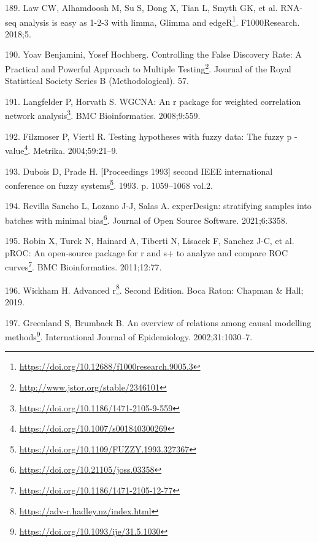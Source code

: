\documentclass[
  12pt,
  a4paper,
  twoside,
  openright]{book}
\DeclareRobustCommand{\href}[2]{#2\footnote{\url{#1}}}
\newlength{\cslhangindent}
\newlength{\cslentryspacingunit} %
\newenvironment{CSLReferences}[2] %
 {%
  \setlength{\parindent}{0pt}
  \ifodd #1
  \let\oldpar\par
  \def\par{\hangindent=\cslhangindent\oldpar}
  \fi
  \setlength{\parskip}{#2\cslentryspacingunit}
 }%
 {}
\begin{document}
\begin{CSLReferences}{0}{0}
\leavevmode{}%
189. Law CW, Alhamdoosh M, Su S, Dong X, Tian L, Smyth GK, et al. \href{https://doi.org/10.12688/f1000research.9005.3}{RNA-seq analysis is easy as 1-2-3 with limma, Glimma and edgeR}. F1000Research. 2018;5.

\leavevmode{}%
190. Yoav Benjamini, Yosef Hochberg. \href{http://www.jstor.org/stable/2346101}{Controlling the False Discovery Rate: A Practical and Powerful Approach to Multiple Testing}. Journal of the Royal Statistical Society Series B (Methodological). 57.

\leavevmode{}%
191. Langfelder P, Horvath S. \href{https://doi.org/10.1186/1471-2105-9-559}{WGCNA: An r package for weighted correlation network analysis}. BMC Bioinformatics. 2008;9:559.

\leavevmode{}%
192. Filzmoser P, Viertl R. \href{https://doi.org/10.1007/s001840300269}{Testing hypotheses with fuzzy data: The fuzzy p -value}. Metrika. 2004;59:21--9.

\leavevmode{}%
193. Dubois D, Prade H. \href{https://doi.org/10.1109/FUZZY.1993.327367}{{[}Proceedings 1993{]} second IEEE international conference on fuzzy systems}. 1993. p. 1059--1068 vol.2.

\leavevmode{}%
194. Revilla Sancho L, Lozano J-J, Salas A. \href{https://doi.org/10.21105/joss.03358}{experDesign: stratifying samples into batches with minimal bias}. Journal of Open Source Software. 2021;6:3358.

\leavevmode{}%
195. Robin X, Turck N, Hainard A, Tiberti N, Lisacek F, Sanchez J-C, et al. \href{https://doi.org/10.1186/1471-2105-12-77}{pROC: An open-source package for r and s+ to analyze and compare ROC curves}. BMC Bioinformatics. 2011;12:77.

\leavevmode{}%
196. Wickham H. \href{https://adv-r.hadley.nz/index.html}{Advanced r}. Second Edition. Boca Raton: Chapman \& Hall; 2019.

\leavevmode{}%
197. Greenland S, Brumback B. \href{https://doi.org/10.1093/ije/31.5.1030}{An overview of relations among causal modelling methods}. International Journal of Epidemiology. 2002;31:1030--7.


\end{CSLReferences}
\end{document}
